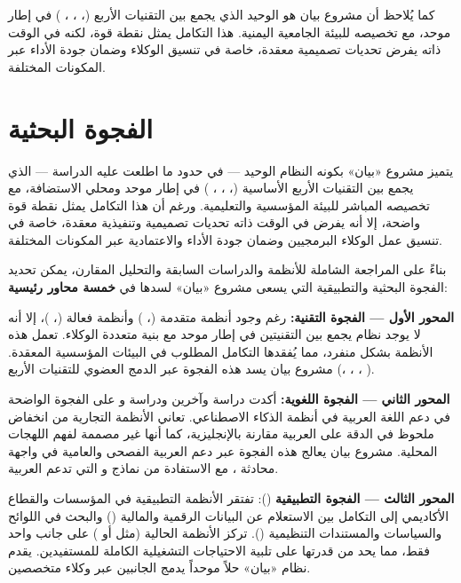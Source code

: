 كما يُلاحظ أن مشروع بيان هو الوحيد الذي يجمع بين التقنيات الأربع
(، ، ، ) في إطار موحد، مع
تخصيصه للبيئة الجامعية اليمنية. هذا التكامل يمثل نقطة قوة، لكنه في الوقت ذاته
يفرض تحديات تصميمية معقدة، خاصة في تنسيق الوكلاء وضمان جودة الأداء عبر
المكونات المختلفة.

\section{الفجوة البحثية}
\label{sec:gap}

يتميز مشروع «بيان» بكونه النظام الوحيد — في حدود ما اطلعت عليه الدراسة — الذي
يجمع بين التقنيات الأربع الأساسية (، ، ، ) في إطار موحد ومحلي الاستضافة، مع تخصيصه المباشر
للبيئة المؤسسية والتعليمية. ورغم أن هذا التكامل يمثل نقطة قوة واضحة، إلا أنه
يفرض في الوقت ذاته تحديات تصميمية وتنفيذية معقدة، خاصة في تنسيق عمل الوكلاء
البرمجيين وضمان جودة الأداء والاعتمادية عبر المكونات المختلفة.

بناءً على المراجعة الشاملة للأنظمة والدراسات السابقة والتحليل المقارن، يمكن
تحديد الفجوة البحثية والتطبيقية التي يسعى مشروع «بيان» لسدها في \textbf{خمسة
محاور رئيسية}:

\textbf{المحور الأول — الفجوة التقنية:} رغم وجود أنظمة  متقدمة
(، ) وأنظمة  فعالة
(، )، إلا أنه لا يوجد نظام يجمع بين التقنيتين في
إطار موحد مع بنية متعددة الوكلاء. تعمل هذه الأنظمة بشكل منفرد، مما يُفقدها
التكامل المطلوب في البيئات المؤسسية المعقدة. مشروع بيان يسد هذه الفجوة عبر
الدمج العضوي للتقنيات الأربع (، ، ،
).

\textbf{المحور الثاني — الفجوة اللغوية:} أكدت دراسة  وآخرين
\cite{guellil2021arabic} ودراسة  و
\cite{darwish2014arabicir} على الفجوة
الواضحة في دعم اللغة العربية في أنظمة الذكاء الاصطناعي. تعاني الأنظمة
التجارية من انخفاض ملحوظ في الدقة على العربية مقارنة بالإنجليزية، كما أنها غير
مصممة لفهم اللهجات المحلية. مشروع بيان يعالج هذه الفجوة عبر دعم العربية
الفصحى والعامية في واجهة محادثة ، مع الاستفادة من نماذج  و
 التي تدعم العربية.

\textbf{المحور الثالث — الفجوة التطبيقية} (): تفتقر الأنظمة
التطبيقية في المؤسسات والقطاع الأكاديمي إلى التكامل بين الاستعلام عن البيانات
الرقمية والمالية () والبحث في اللوائح والسياسات والمستندات
التنظيمية (). تركز الأنظمة الحالية (مثل  أو
) على جانب واحد فقط، مما يحد من قدرتها على تلبية الاحتياجات
التشغيلية الكاملة للمستفيدين. يقدم نظام «بيان» حلاً موحداً يدمج الجانبين عبر
وكلاء متخصصين.

